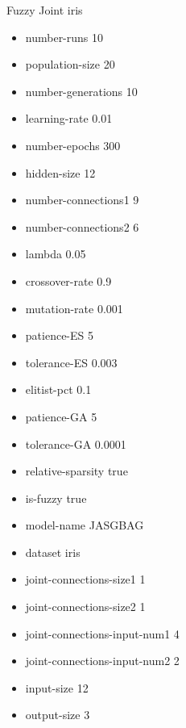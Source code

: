 Fuzzy Joint
iris
\begin{itemize}
\item number-runs 10
\item population-size 20
\item number-generations 10
\item learning-rate 0.01
\item number-epochs 300
\item hidden-size 12
\item number-connections1 9
\item number-connections2 6
\item lambda 0.05
\item crossover-rate 0.9
\item mutation-rate 0.001
\item patience-ES 5
\item tolerance-ES 0.003
\item elitist-pct 0.1
\item patience-GA 5
\item tolerance-GA 0.0001
\item relative-sparsity true
\item is-fuzzy true
\item model-name JASGBAG
\item dataset iris
\item joint-connections-size1 1
\item joint-connections-size2 1
\item joint-connections-input-num1 4
\item joint-connections-input-num2 2
\item input-size 12
\item output-size 3
\end{itemize}

